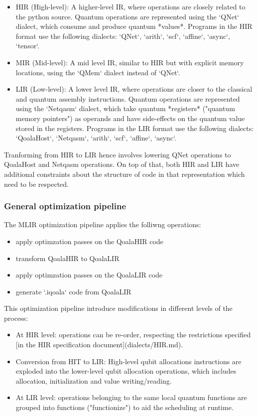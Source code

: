 \begin{itemize}
\item HIR (High-level): A higher-level IR, where operations are closely related
  to the python source.
  Quantum operations are represented using the `QNet` dialect, which consume and produce quantum *values*.
  Programs in the HIR format use the following dialects: `QNet`, `arith`, `scf`, `affine`, `async`, `tensor`.
\item MIR (Mid-level): A mid level IR, similar to HIR but with explicit memory locations, using the `QMem` dialect instead of `QNet`.
\item LIR (Low-level): A lower level IR, where operations are closer to the
  classical and quantum assembly instructions.
  Quantum operations are represented using the `Netqasm` dialect, which take quantum *registers* ("quantum memory pointers") as operands
  and have side-effects on the quantum value stored in the registers.
  Programs in the LIR format use the following dialects: `QoalaHost`, `Netqasm`, `arith`, `scf`, `affine`, `async`.
\end{itemize}

Tranforming from HIR to LIR hence involves lowering QNet operations to QoalaHost and Netqasm operations.
On top of that, both HIR and LIR have additional constraints about the structure of code in that representation which need to be respected.


\subsubsection{General optimization pipeline}
The MLIR optimization pipeline applies the folliwng operations:
\begin{itemize}
\item apply optimzation passes on the QoalaHIR code
\item transform QoalaHIR to QoalaLIR
\item apply optimzation passes on the QoalaLIR code
\item generate `.iqoala` code from QoalaLIR
\end{itemize}

This optimization pipeline introduce modifications in different levels of the process:
\begin{itemize}
\item At HIR level: operations can be re-order, respecting the restrictions specified
  [in the HIR specification document](dialects/HIR.md).
\item Conversion from HIT to LIR: High-level qubit allocations instructions are exploded
  into the lower-level qubit allocation operations, which includes allocation,
  initialization and value writing/reading.
\item At LIR level: operations belonging to the same local quantum functions are grouped
  into functions ("functionize") to aid the scheduling at runtime.
\end{itemize}


